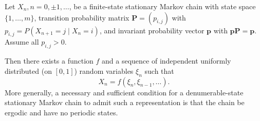 Let $X_n, n = 0, \pm 1, \ldots$, be a finite-state stationary Markov chain with state space $\{1, \ldots, m\}$, transition probability matrix
$\mathbf{P} = (p_{i,j})$ with $p_{i,j} = P(X_{n+1}=j \mid X_n=i)$, and invariant probability vector $\mathbf{p}$ with $\mathbf{p}\mathbf{P} = \mathbf{p}$. Assume all $p_{i,j} > 0$.

Then there exists a function $f$ and a sequence of independent uniformly distributed (on $[0,1]$) random variables $\xi_n$ such that
$$X_n = f(\xi_n, \xi_{n-1}, \ldots).$$
More generally, a necessary and sufficient condition for a denumerable-state stationary Markov chain to admit such a representation is that the chain be ergodic and have no periodic states.
